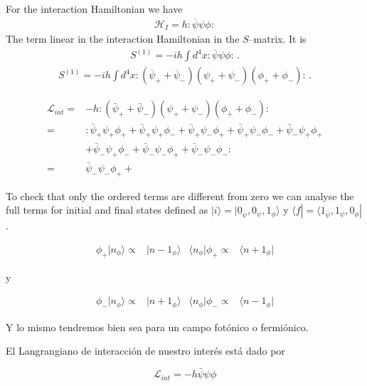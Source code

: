 For the interaction Hamiltonian we have
\begin{align}
  \mathcal{H}_I=h:\overline{\psi}\psi\phi:
\end{align}
The term linear in the interaction Hamiltonian in the $S$--matrix. It is
\begin{align}
  S^{(1)}=-i h \int d^4x:\overline{\psi}\psi\phi:\,.
\end{align}
\begin{align}
  S^{(1)}=-i h \int d^4x:(\overline{\psi}_++\overline{\psi}_-)(\psi_++\psi_-)(\phi_++\phi_-):\,.
\end{align}




\begin{align}
 \mathcal{L}_{int}=&-h:\left( \bar{\psi}_{+}+\bar{\psi}_{-}\right) \left( \psi_{+}+\psi_{-}\right) \left( \phi_{+}+\phi_{-}\right):\nonumber\\
=&:
\bar{\psi}_{+}\psi_{+}\phi_{+}+ 
\bar{\psi}_{+}\psi_{+}\phi_{-}+ 
\bar{\psi}_{+}\psi_{-}\phi_{+}+ 
\bar{\psi}_{+}\psi_{-}\phi_{-}+ 
\bar{\psi}_{-}\psi_{+}\phi_{+}\nonumber\\ 
&+\bar{\psi}_{-}\psi_{+}\phi_{-}+ 
\bar{\psi}_{-}\psi_{-}\phi_{+}+ 
\bar{\psi}_{-}\psi_{-}\phi_{-} 
:\nonumber\\
=&\bar{\psi}_{-}\psi_{-}\phi_{+}+ 
\end{align}


To check that only the ordered terms are different from zero we can analyse the full terms for initial and final states defined as $|i\rangle=|0_{\bar{\psi}},0_{\psi},1_{\phi}\rangle$ y $\langle f|=\langle 1_{\bar{\psi}},1_{\psi},0_\phi|$. 

\begin{align}
 \phi_{+} | n_{\phi} \rangle  \propto& |n-1_{\phi}\rangle & \langle n_{\phi}|\phi_{+} \propto& \langle n+1_{\phi}|
\end{align}

y

\begin{align}
 \phi_{-} |n_{\phi}\rangle  \propto& |n+1_{\phi}\rangle&  \langle n_{\phi}| \phi_{-} \propto& \langle n-1_{\phi}|
\end{align}

Y lo mismo tendremos bien sea para un campo fot\'onico o fermi\'onico.

El Langrangiano de interacci\'on de nuestro inter\'es est\'a dado por

\begin{equation}
 \mathcal{L}_{int}=-h\bar{\psi}\psi\phi
\end{equation}

